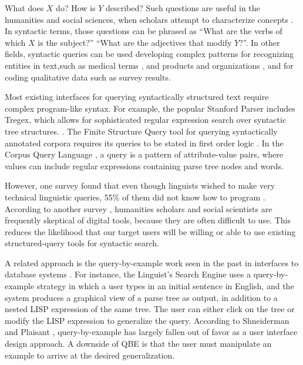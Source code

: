 What does $X$ do? How is $Y$ described? Such questions are useful in the humanities and social sciences, when scholars attempt to characterize concepts \cite{muralidharan2013supporting}. In syntactic terms, those questions can be phrased as ``What are the verbs of which $X$ is the subject?'' ``What are the adjectives that modify $Y$?''. In other fields, syntactic queries can be used developing complex patterns for recognizing entities in text,such as medical terms \cite{hirschman2005overview,maclean2013identifying}, and  products and organizations \cite{culotta2005reducing}, and for coding qualitative data such as survey results.

Most existing interfaces for querying syntactically structured text require complex program-like syntax. For example, the popular Stanford Parser includes Tregex, which allows for sophisticated regular expression search over syntactic tree structures.
\cite{levy2006tregex}. The Finite Structure Query tool for querying syntactically annotated corpora requires its queries to be stated in first order logic \cite{kepser2003finite}. In the Corpus Query Language \cite{jakubicek2010fast}, a query is a pattern of attribute-value pairs, where values can include regular expressions containing parse tree nodes and words.

However, one survey found that even though linguists wished to make very technical  linguistic queries, 55\% of them did not know how to program \cite{soehn2008requirements}. According to another survey \cite{gibbs_building_2012}, humanities scholars and social scientists are frequently skeptical of digital tools, because they are often difficult to use. This reduces the likelihood that our target users will be willing or able to use existing structured-query tools for syntactic search.

A related approach is the query-by-example work seen in the past in interfaces to database systems \cite{androutsopoulos1995natural}. For instance, the Linguist's Search Engine \cite{resnik2005web} uses a query-by-example strategy in which a user types in an initial sentence in English, and the system produces a graphical view of a parse tree as output, in addition to a nested LISP expression of the same tree.  The user can either click on the tree or modify the LISP expression to generalize the query. %
According to Shneiderman and Plaisant \cite{shneiderman2010designing}, query-by-example has largely fallen out of favor as a user interface design approach. A downside of QBE is that the user must manipulate an example to arrive at the desired generalization.

